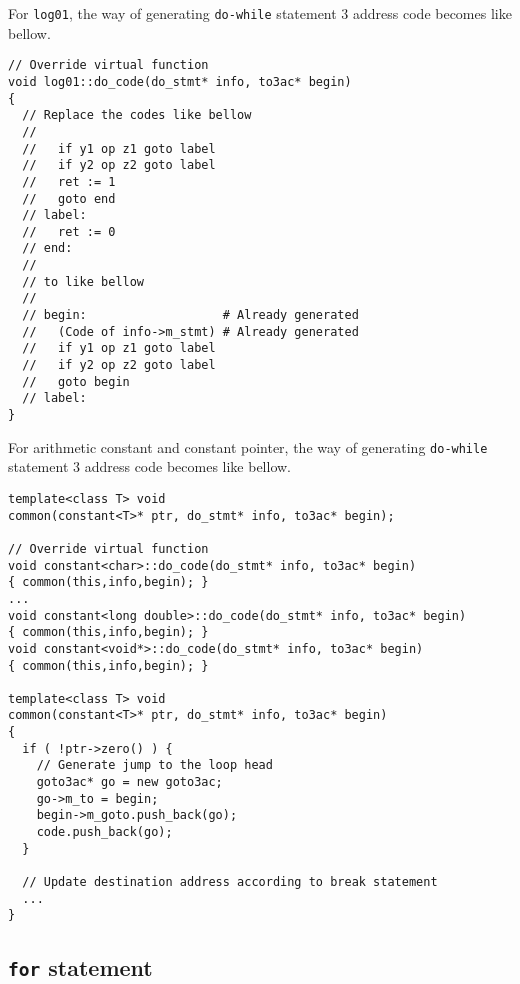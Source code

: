 For {\tt{log01}},
the way of generating {\tt{do-while}} statement 3 address code
becomes like bellow.
\begin{verbatim}
// Override virtual function
void log01::do_code(do_stmt* info, to3ac* begin)
{
  // Replace the codes like bellow
  //
  //   if y1 op z1 goto label
  //   if y2 op z2 goto label
  //   ret := 1
  //   goto end
  // label:
  //   ret := 0
  // end:
  //
  // to like bellow
  //
  // begin:                   # Already generated
  //   (Code of info->m_stmt) # Already generated
  //   if y1 op z1 goto label
  //   if y2 op z2 goto label
  //   goto begin
  // label:
}
\end{verbatim}
For arithmetic constant and constant pointer,
the way of generating {\tt{do-while}} statement 3 address code
becomes like bellow.
\begin{verbatim}
template<class T> void
common(constant<T>* ptr, do_stmt* info, to3ac* begin);

// Override virtual function
void constant<char>::do_code(do_stmt* info, to3ac* begin)
{ common(this,info,begin); }
...
void constant<long double>::do_code(do_stmt* info, to3ac* begin)
{ common(this,info,begin); }
void constant<void*>::do_code(do_stmt* info, to3ac* begin)
{ common(this,info,begin); }

template<class T> void
common(constant<T>* ptr, do_stmt* info, to3ac* begin)
{
  if ( !ptr->zero() ) {
    // Generate jump to the loop head
    goto3ac* go = new goto3ac;
    go->m_to = begin;
    begin->m_goto.push_back(go);
    code.push_back(go);
  }

  // Update destination address according to break statement
  ...
}
\end{verbatim}

\subsection{{\tt{for}} statement}

